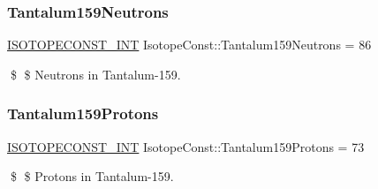 \subsubsection{\texorpdfstring{Tantalum159\+Neutrons}{Tantalum159Neutrons}}
{\footnotesize\ttfamily \mbox{\hyperlink{group___isotope_const-_macros_ga5f18360b3e99483a35c32d789e62621c}{I\+S\+O\+T\+O\+P\+E\+C\+O\+N\+S\+T\+\_\+\+I\+NT}} Isotope\+Const\+::\+Tantalum159\+Neutrons = 86}

\$ \$ Neutrons in Tantalum-\/159. \mbox{\label{group___isotope_const-_tantalum-_ta159_ga22aba146eb99c52b026b1c8958165125}} 
\subsubsection{\texorpdfstring{Tantalum159\+Protons}{Tantalum159Protons}}
{\footnotesize\ttfamily \mbox{\hyperlink{group___isotope_const-_macros_ga5f18360b3e99483a35c32d789e62621c}{I\+S\+O\+T\+O\+P\+E\+C\+O\+N\+S\+T\+\_\+\+I\+NT}} Isotope\+Const\+::\+Tantalum159\+Protons = 73}

\$ \$ Protons in Tantalum-\/159. 
